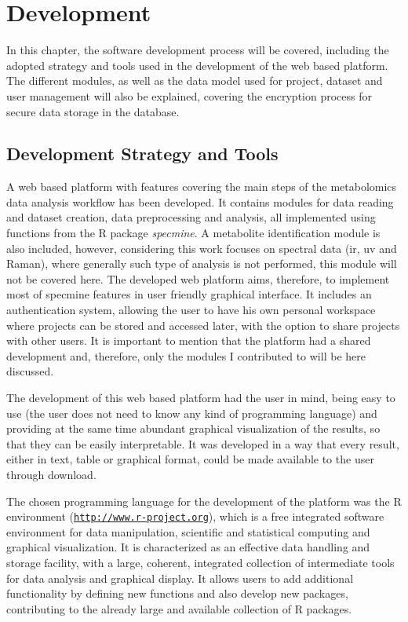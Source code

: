
\chapter{Development} \label{development}

In this chapter, the software development process will be covered, including the adopted strategy and tools used in the development of the web based platform. The different modules, as well as the data model used for project, dataset and user management will also be explained, covering the encryption process for secure data storage in the database.


\section{Development Strategy and Tools}

A web based platform with features covering the main steps of the metabolomics data analysis workflow has been developed. It contains modules for data reading and dataset creation, data preprocessing and analysis, all implemented using functions from the R package \textit{specmine}. A metabolite identification module is also included, however, considering this work focuses on spectral data (\gls{ir}, \gls{uv} and Raman), where generally such type of analysis is not performed, this module will not be covered here. The developed web platform aims, therefore, to implement most of specmine features in user friendly graphical interface. It includes an authentication system, allowing the user to have his own personal workspace where projects can be stored and accessed later, with the option to share projects with other users. It is important to mention that the platform had a shared development and, therefore, only the modules I contributed to will be here discussed.

The development of this web based platform had the user in mind, being easy to use (the user does not need to know any kind of programming language) and providing at the same time abundant graphical visualization of the results, so that they can be easily interpretable. It was developed in a way that every result, either in text, table or graphical format, could be made available to the user through download. 

The chosen programming language for the development of the platform was the R environment (\href{http://www.r-project.org}{\nolinkurl{http://www.r-project.org}}), which is a free integrated software environment for data manipulation, scientific and statistical computing and graphical visualization. It is characterized as an effective data handling and storage facility, with a large, coherent, integrated collection of intermediate tools for data analysis and graphical display. It allows users to add additional functionality by defining new functions and also develop new packages, contributing to the already large and available collection of R packages. 

